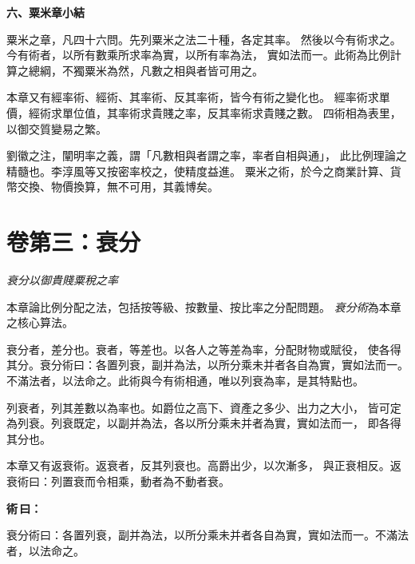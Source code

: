 \documentclass[11pt,a4paper]{article}
\newenvironment{method}{%
  \par\noindent\textcolor{methodcolor}{\textbf{術\,曰：}}%
  \ignorespaces
}{\par\vspace{0.4em}}
\begin{document}
\vspace{0.8em}
\noindent\textbf{\large 六、粟米章小結}
\vspace{0.5em}

\begin{quoting}
粟米之章，凡四十六問。先列粟米之法二十種，各定其率。
然後以今有術求之。今有術者，以所有數乘所求率為實，以所有率為法，
實如法而一。此術為比例計算之總綱，不獨粟米為然，凡數之相與者皆可用之。

本章又有經率術、經術、其率術、反其率術，皆今有術之變化也。
經率術求單價，經術求單位值，其率術求貴賤之率，反其率術求貴賤之數。
四術相為表里，以御交質變易之繁。

劉徽之注，闡明率之義，謂「凡數相與者謂之率，率者自相與通」，
此比例理論之精髓也。李淳風等又按密率校之，使精度益進。
粟米之術，於今之商業計算、貨幣交換、物價換算，無不可用，其義博矣。
\end{quoting}

\newpage


\section{卷第三：衰分}
\label{sec:cuifen}

\begin{center}
\textit{衰分以御貴賤粟稅之率}
\end{center}

\noindent 本章論比例分配之法，包括按等級、按數量、按比率之分配問題。
\textit{衰分術}為本章之核心算法。

\noindent 衰分者，差分也。衰者，等差也。以各人之等差為率，分配財物或賦役，
使各得其分。衰分術曰：各置列衰，副并為法，以所分乘未并者各自為實，實如法而一。
不滿法者，以法命之。此術與今有術相通，唯以列衰為率，是其特點也。

\noindent 列衰者，列其差數以為率也。如爵位之高下、資產之多少、出力之大小，
皆可定為列衰。列衰既定，以副并為法，各以所分乘未并者為實，實如法而一，
即各得其分也。

\noindent 本章又有返衰術。返衰者，反其列衰也。高爵出少，以次漸多，
與正衰相反。返衰術曰：列置衰而令相乘，動者為不動者衰。

\bigskip

\begin{method}
衰分術曰：各置列衰，副并為法，以所分乘未并者各自為實，實如法而一。不滿法者，以法命之。
\end{method}
\end{document}
